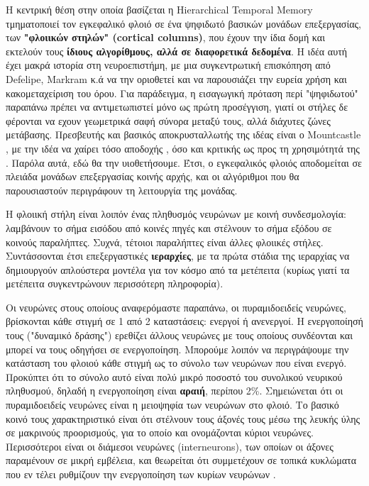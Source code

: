 	Η κεντρική θέση στην οποία βασίζεται η Hierarchical Temporal Memory τμηματοποιεί τον εγκεφαλικό φλοιό σε ένα ψηφιδωτό βασικών μονάδων επεξεργασίας,
	των \textbf{"φλοιικών στηλών" (cortical columns)},
	που έχουν την ίδια δομή και εκτελούν τους \textbf{ίδιους αλγορίθμους, αλλά σε διαφορετικά δεδομένα}.
	Η ιδέα αυτή έχει μακρά ιστορία στη νευροεπιστήμη, με μια συγκεντρωτική επισκόπηση από Defelipe, Markram κ.ά \cite{defelipeNeocorticalColumn2012}
	να την οριοθετεί και να παρουσιάζει την ευρεία χρήση και κακομεταχείριση του όρου.
	Για παράδειγμα, η εισαγωγική πρόταση περί "ψηφιδωτού" παραπάνω πρέπει να αντιμετωπιστεί μόνο ως πρώτη προσέγγιση,
	γιατί οι στήλες δε φέρονται να εχουν γεωμετρικά σαφή σύνορα μεταξύ τους, αλλά διάχυτες ζώνες μετάβασης.
	Πρεσβευτής και βασικός αποκρυσταλλωτής της ιδέας είναι ο Mountcastle \parencite{mountcastleColumnarOrganizationNeocortex1997},
	με την ιδέα να χαίρει τόσο αποδοχής \parencite{haueisLifeCorticalColumn2016}, όσο και κριτικής ως προς τη χρησιμότητά της \parencite{hortonCorticalColumnStructure2005}.
	Παρόλα αυτά, εδώ θα την υιοθετήσουμε.
	Έτσι, ο εγκεφαλικός φλοιός αποδομείται σε πλειάδα μονάδων επεξεργασίας κοινής αρχής, και οι αλγόριθμοι που θα παρουσιαστούν περιγράφουν τη λειτουργία της μονάδας.

	Η φλοιική στήλη είναι λοιπόν ένας πληθυσμός νευρώνων με κοινή συνδεσμολογία: λαμβάνουν το σήμα εισόδου από κοινές πηγές και στέλνουν το σήμα εξόδου σε κοινούς παραλήπτες.
	Συχνά, τέτοιοι παραλήπτες είναι άλλες φλοιικές στήλες.
	Συντάσσονται έτσι επεξεργαστικές \textbf{ιεραρχίες}, με τα πρώτα στάδια της ιεραρχίας να δημιουργούν απλούστερα μοντέλα για τον κόσμο από τα μετέπειτα
	(κυρίως γιατί τα μετέπειτα συγκεντρώνουν περισσότερη πληροφορία).

	Οι νευρώνες στους οποίους αναφερόμαστε παραπάνω, οι πυραμιδοειδείς νευρώνες, βρίσκονται κάθε στιγμή σε 1 από 2 καταστάσεις: ενεργοί ή ανενεργοί.
	Η ενεργοποίησή τους ("δυναμικό δράσης") ερεθίζει άλλους νευρώνες με τους οποίους συνδέονται και μπορεί να τους οδηγήσει σε ενεργοποίηση.
	Μπορούμε λοιπόν να περιγράψουμε την κατάσταση του φλοιού κάθε στιγμή ως το σύνολο των νευρώνων που είναι ενεργό.
	Προκύπτει ότι το σύνολο αυτό είναι πολύ μικρό ποσοστό του συνολικού νευρικού πληθυσμού, δηλαδή η ενεργοποίηση είναι \textbf{αραιή}, περίπου 2\%.
	Σημειώνεται ότι οι πυραμιδοειδείς νευρώνες είναι η μειοψηφία των νευρώνων στο φλοιό.
	Το βασικό κοινό τους χαρακτηριστικό είναι ότι στέλνουν τους άξονές τους μέσω της λευκής ύλης σε μακρινούς προορισμούς, για το οποίο και ονομάζονται κύριοι νευρώνες.
	Περισσότεροι είναι οι διάμεσοι νευρώνες (interneurons), των οποίων οι άξονες παραμένουν σε μικρή εμβέλεια, και θεωρείται ότι συμμετέχουν σε τοπικά κυκλώματα
	που εν τέλει ρυθμίζουν την ενεργοποίηση των κυρίων νευρώνων \parencite{freundInterneurons2008}.

